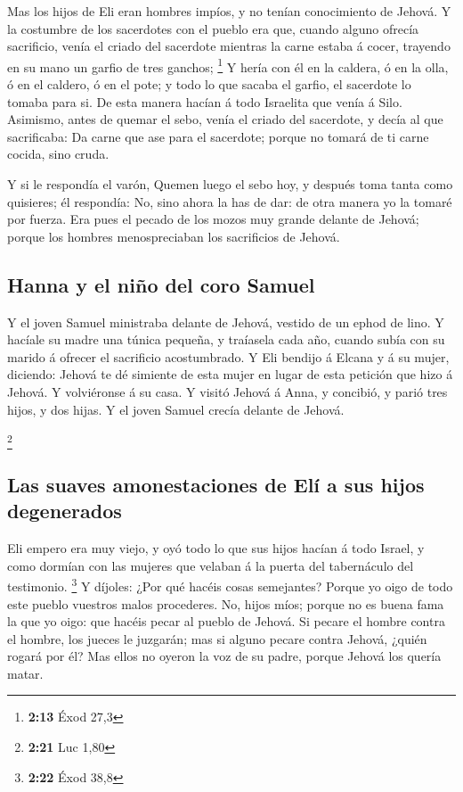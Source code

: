  Mas los hijos de Eli eran hombres impíos, y no tenían
conocimiento de Jehová.  Y la costumbre de los sacerdotes
con el pueblo era que, cuando alguno ofrecía sacrificio, venía el criado
del sacerdote mientras la carne estaba á cocer, trayendo en su mano un
garfio de tres ganchos; \footnote{\textbf{2:13} Éxod 27,3}
 Y hería con él en la caldera, ó en la olla, ó en el
caldero, ó en el pote; y todo lo que sacaba el garfio, el sacerdote lo
tomaba para si. De esta manera hacían á todo Israelita que venía á Silo.
 Asimismo, antes de quemar el sebo, venía el criado del
sacerdote, y decía al que sacrificaba: Da carne que ase para el
sacerdote; porque no tomará de ti carne cocida, sino cruda.

 Y si le respondía el varón, Quemen luego el sebo hoy, y
después toma tanta como quisieres; él respondía: No, sino ahora la has
de dar: de otra manera yo la tomaré por fuerza.  Era pues
el pecado de los mozos muy grande delante de Jehová; porque los hombres
menospreciaban los sacrificios de Jehová.

\hypertarget{hanna-y-el-niuxf1o-del-coro-samuel}{%
\subsection{Hanna y el niño del coro
Samuel}\label{hanna-y-el-niuxf1o-del-coro-samuel}}

 Y el joven Samuel ministraba delante de Jehová, vestido
de un ephod de lino.  Y hacíale su madre una túnica
pequeña, y traíasela cada año, cuando subía con su marido á ofrecer el
sacrificio acostumbrado.  Y Eli bendijo á Elcana y á su
mujer, diciendo: Jehová te dé simiente de esta mujer en lugar de esta
petición que hizo á Jehová. Y volviéronse á su casa.  Y
visitó Jehová á Anna, y concibió, y parió tres hijos, y dos hijas. Y el
joven Samuel crecía delante de Jehová.

\footnote{\textbf{2:21} Luc 1,80}

\hypertarget{las-suaves-amonestaciones-de-eluxed-a-sus-hijos-degenerados}{%
\subsection{Las suaves amonestaciones de Elí a sus hijos
degenerados}\label{las-suaves-amonestaciones-de-eluxed-a-sus-hijos-degenerados}}

 Eli empero era muy viejo, y oyó todo lo que sus hijos
hacían á todo Israel, y como dormían con las mujeres que velaban á la
puerta del tabernáculo del testimonio. \footnote{\textbf{2:22} Éxod 38,8}
 Y díjoles: ¿Por qué hacéis cosas semejantes? Porque yo
oigo de todo este pueblo vuestros malos procederes.  No,
hijos míos; porque no es buena fama la que yo oigo: que hacéis pecar al
pueblo de Jehová.  Si pecare el hombre contra el hombre,
los jueces le juzgarán; mas si alguno pecare contra Jehová, ¿quién
rogará por él? Mas ellos no oyeron la voz de su padre, porque Jehová los
quería matar.

